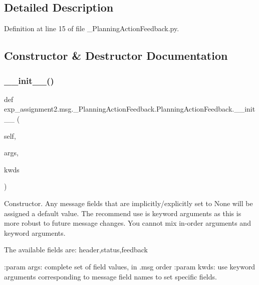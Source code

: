 \subsection{Detailed Description}


Definition at line 15 of file \+\_\+\+Planning\+Action\+Feedback.\+py.



\subsection{Constructor \& Destructor Documentation}
\mbox{\label{classexp__assignment2_1_1msg_1_1__PlanningActionFeedback_1_1PlanningActionFeedback_a246a012ca5e7648813f92d290c039aca}} 
\subsubsection{\texorpdfstring{\+\_\+\+\_\+init\+\_\+\+\_\+()}{\_\_init\_\_()}}
{\footnotesize\ttfamily def exp\+\_\+assignment2.\+msg.\+\_\+\+Planning\+Action\+Feedback.\+Planning\+Action\+Feedback.\+\_\+\+\_\+init\+\_\+\+\_\+ (\begin{DoxyParamCaption}\item[{}]{self,  }\item[{}]{args,  }\item[{}]{kwds }\end{DoxyParamCaption})}

\begin{DoxyVerb}Constructor. Any message fields that are implicitly/explicitly
set to None will be assigned a default value. The recommend
use is keyword arguments as this is more robust to future message
changes.  You cannot mix in-order arguments and keyword arguments.

The available fields are:
   header,status,feedback

:param args: complete set of field values, in .msg order
:param kwds: use keyword arguments corresponding to message field names
to set specific fields.
\end{DoxyVerb}
 

